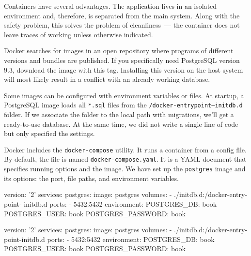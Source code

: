Containers have several advantages. The application lives in an isolated environment and, therefore, is separated from the main system. Along with the safety problem, this solves the problem of cleanliness~--- the container does not leave traces of working unless otherwise indicated.

Docker searches for images in an open repository where programs of different versions and bundles are published. If you specifically need PostgreSQL version 9.3, download the image with this tag. Installing this version on the host system will most likely result in a conflict with an already working database.


Some images can be configured with environment variables or files. At startup, a PostgreSQL image loads all \verb|*.sql| files from the \texttt{/docker-entrypoint--initdb.d} folder. If we associate the folder to the local path with migrations, we'll get a ready-to-use database. At the same time, we did not write a single line of code but only specified the settings.


Docker includes the \texttt{docker\--compose} utility. It runs a container from a config file. By default, the file is named \verb|docker-compose.yaml|. It is a YAML document that specifies running options and the image. We have set up the \verb|postgres| image and its options: the port, file paths, and environment variables.


\ifnarrow

\begin{english}
  \begin{yaml}
version: '2'
services:
  postgres:
    image: postgres
    volumes:
      - ./initdb.d:/docker-entrypoint-
                                initdb.d
    ports:
      - 5432:5432
    environment:
      POSTGRES_DB: book
      POSTGRES_USER: book
      POSTGRES_PASSWORD: book
  \end{yaml}
\end{english}

\else

\begin{english}
  \begin{yaml}
version: '2'
services:
  postgres:
    image: postgres
    volumes:
      - ./initdb.d:/docker-entrypoint-initdb.d
    ports:
      - 5432:5432
    environment:
      POSTGRES_DB: book
      POSTGRES_USER: book
      POSTGRES_PASSWORD: book
  \end{yaml}
\end{english}

